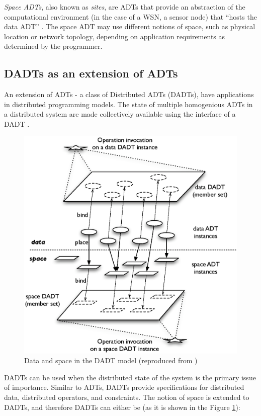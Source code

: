 \emph{Space ADTs}, also known as \emph{sites}, are ADTs that provide an
abstraction of the computational environment (in the case of a WSN, a sensor
node) that ``hosts the data ADT'' \cite{migliavacca_DADT:2006}. The space ADT may
use different notions of space, such as physical location or network topology,
depending on application requirements as determined by the programmer.

\subsection{DADTs as an extension of ADTs} \label{subsec:DADTsConcepts}
An extension of ADTs - a class of Distributed ADTs (DADTs), have applications 
in distributed programming models. The state of multiple homogenious ADTs in a
distributed system are made collectively available using the interface of a DADT
\cite{migliavacca_DADT:2006}. 

\begin{figure}[h]
\centering
\includegraphics[scale=0.65]{img/DADTs.eps} 
\caption[Data and space in the DADT model]{Data and space in the DADT model (reproduced from 
\cite{migliavacca_DADT:2006})}
\label{Fig:DADTs}
\end{figure}

DADTs can be used when the distributed state of the system is the primary issue of importance. Similar to ADTs, DADTs 
provide specifications for distributed data, distributed operators, and 
constraints. The notion of space is extended to DADTs, and therefore DADTs can
either be (as it is shown in the Figure \ref{Fig:DADTs}):

